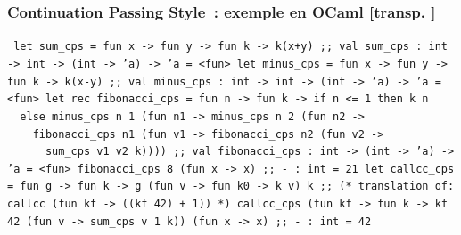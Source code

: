 \documentclass[mathserif,a4paper,aspectratio=169]{beamer}
\renewcommand{\frametitle}[1]{\subsubsection*{#1 {\footnotesize[transp. \insertframenumber]}}}
\begin{document}
\begin{frame}
\frametitle{Continuation Passing Style : exemple en OCaml}

{\footnotesize\tt
let sum\_cps = fun x -> fun y -> fun k -> k(x+y) ;;\newline
{\color{purple}val sum\_cps : int -> int -> (int -> 'a) -> 'a = <fun>}\newline
let minus\_cps = fun x -> fun y -> fun k -> k(x-y) ;;\newline
{\color{purple}val minus\_cps : int -> int -> (int -> 'a) -> 'a = <fun>}\newline
let rec fibonacci\_cps = fun n -> fun k -> if n <= 1 then k n\newline
\ \ else minus\_cps n 1 (fun n1 -> minus\_cps n 2 (fun n2 ->\newline
\ \ \ \ fibonacci\_cps n1 (fun v1 -> fibonacci\_cps n2 (fun v2 ->\newline
\ \ \ \ \ \ sum\_cps v1 v2 k)))) ;;\newline
{\color{purple}val fibonacci\_cps : int -> (int -> 'a) -> 'a = <fun>}\newline
fibonacci\_cps 8 (fun x -> x) ;;\newline
{\color{purple}- : int = 21}\newline
let callcc\_cps = fun g -> fun k -> g (fun v -> fun k0 -> k v) k ;;\newline
(* translation of: callcc (fun kf -> ((kf 42) + 1)) *)\newline
callcc\_cps (fun kf -> fun k -> kf 42 (fun v -> sum\_cps v 1 k)) (fun x -> x) ;;\newline
{\color{purple}- : int = 42}
\par}

\end{frame}
%
\end{document}
